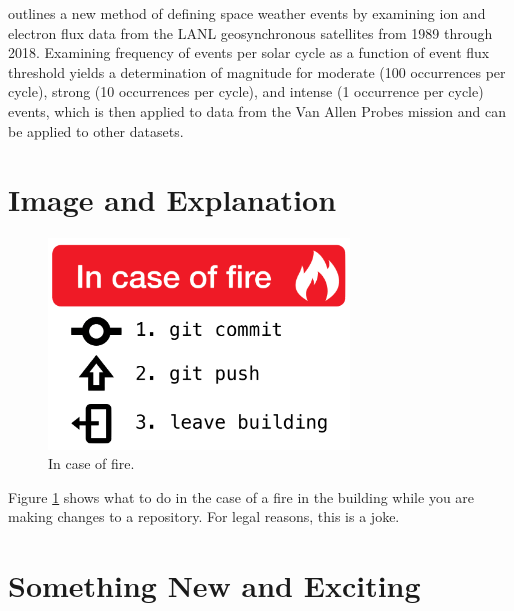\documentclass[12pt, letterpaper]{article}
\begin{document}
\citet[]{Reeves2020} outlines a new method of defining space weather events by examining ion and electron flux data from the LANL geosynchronous satellites from 1989 through 2018. Examining frequency of events per solar cycle as a function of event flux threshold yields a determination of magnitude for moderate (100 occurrences per cycle), strong (10 occurrences per cycle), and intense (1 occurrence per cycle) events, which is then applied to data from the Van Allen Probes mission and can be applied to other datasets.

\section{Image and Explanation}


\begin{figure}[!ht]
  \centering
  \includegraphics[width=8cm]{meme.png}
  \caption{In case of fire.}
  \label{fig:meme}
\end{figure}

Figure \ref{fig:meme} shows what to do in the case of a fire in the building while you are making changes to a repository. For legal reasons, this is a joke.


\section{Something New and Exciting}

\end{document}
